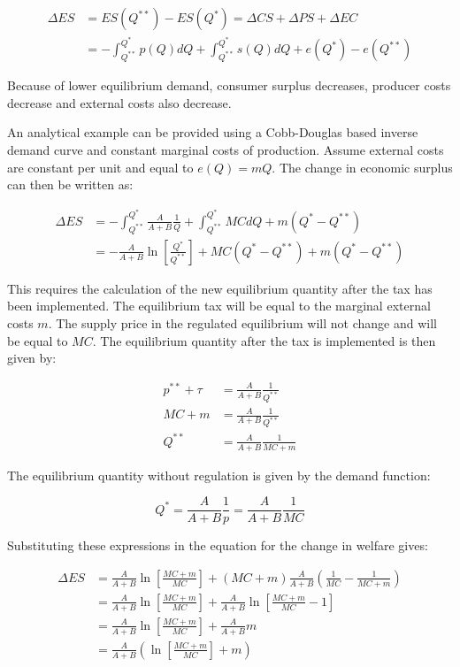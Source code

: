 \documentclass[
]{book}
\begin{document}
\begin{align}
\Delta ES &= ES (Q^{**}) - ES(Q^*) = \Delta CS + \Delta PS + \Delta EC \\
 &= -\int_{Q^{**}}^{Q^*} p(Q)dQ + \int_{Q^{**}}^{Q^*} s(Q)dQ +e(Q^*) - e(Q^{**})
\end{align}

Because of lower equilibrium demand, consumer surplus decreases, producer costs decrease and external costs also decrease.

An analytical example can be provided using a Cobb-Douglas based inverse demand curve and constant marginal costs of production. Assume external costs are constant per unit and equal to \(e(Q)=mQ\). The change in economic surplus can then be written as:

\begin{align}
\Delta ES &= -\int_{Q^{**}}^{Q^*} \frac{A}{A+B} \frac{1}{Q} +\int_{Q^{**}}^{Q^*} MCdQ + m(Q^* - Q^{**}) \\
&=-\frac{A}{A+B} \ln\left[\frac{Q^*}{Q^{**}} \right] +MC (Q^* - Q^{**}) + m(Q^* - Q^{**})
\end{align}

This requires the calculation of the new equilibrium quantity after the tax has been implemented. The equilibrium tax will be equal to the marginal external costs \(m\). The supply price in the regulated equilibrium will not change and will be equal to \(MC\). The equilibrium quantity after the tax is implemented is then given by:

\begin{align}
p^{**} + \tau &= \frac{A}{A+B} \frac{1}{Q^{**}} \\
MC + m &= \frac{A}{A+B} \frac{1}{Q^{**}} \\
Q^{**} &= \frac{A}{A+B} \frac{1}{MC + m}
\end{align}

The equilibrium quantity without regulation is given by the demand function:

\begin{equation}
Q^* = \frac{A}{A+B} \frac{1}{p} = \frac{A}{A+B} \frac{1} {MC}
\end{equation}

Substituting these expressions in the equation for the change in welfare gives:

\begin{align}
 \Delta ES &= \frac{A}{A+B} \ln \left[\frac{MC + m}{MC} \right] + (MC + m) \frac{A}{A+B} \left(\frac{1}{MC} - \frac{1}{MC + m} \right) \\
 &= \frac{A}{A+B} \ln \left[ \frac{MC + m}{MC} \right] +  \frac{A}{A+B} \ln \left[\frac{MC + m}{MC} -1 \right] \\
 &= \frac{A}{A+B} \ln \left[ \frac{MC + m}{MC} \right] +  \frac{A}{A+B} m \\
 &= \frac{A}{A+B}\left( \ln \left[ \frac{MC + m}{MC} \right] +m \right)
\end{align}
\end{document}
